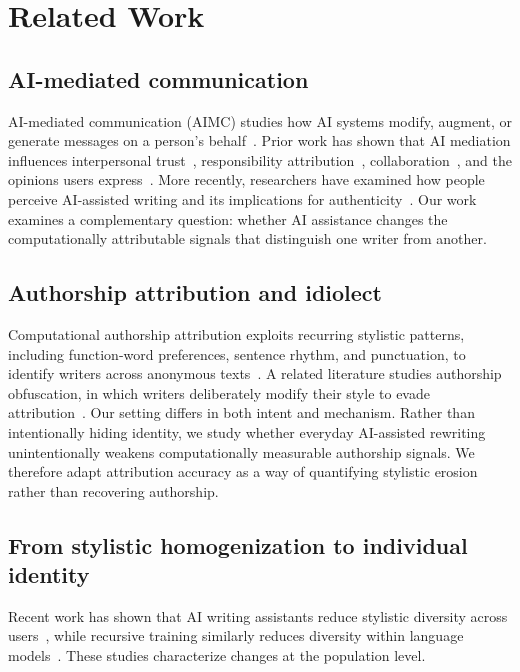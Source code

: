 \documentclass[sigconf,nonacm]{acmart}
\begin{document}
\section{Related Work}

\vspace{4pt}
\subsection{AI-mediated communication}

AI-mediated communication (AIMC) studies how AI systems modify, augment, or generate
messages on a person's behalf~\cite{hancock2020}. Prior work has shown that AI
mediation influences interpersonal trust~\cite{jakesch2019,hohenstein2023},
responsibility attribution~\cite{elish2019,hohenstein2020},
collaboration~\cite{hohenstein2023}, and the opinions users
express~\cite{jakeschcowrite}. More recently, researchers have examined how people
perceive AI-assisted writing and its implications for
authenticity~\cite{hwang2025,kadoma2025}. Our work examines a complementary question:
whether AI assistance changes the computationally attributable signals that
distinguish one writer from another.

\subsection{Authorship attribution and idiolect}

Computational authorship attribution exploits recurring stylistic patterns, including
function-word preferences, sentence rhythm, and punctuation, to identify writers
across anonymous texts~\cite{koppel2009,luar2021}. A related literature studies
authorship obfuscation, in which writers deliberately modify their style to evade
attribution~\cite{brennan2012,potthast2016}. Our setting differs in both intent and
mechanism. Rather than intentionally hiding identity, we study whether everyday
AI-assisted rewriting unintentionally weakens computationally measurable authorship
signals. We therefore adapt attribution accuracy as a way of quantifying stylistic
erosion rather than recovering authorship.

\subsection{From stylistic homogenization to individual identity}

Recent work has shown that AI writing assistants reduce stylistic diversity across
users~\cite{padmakumar2024,agarwal2025,doshi2024}, while recursive training similarly
reduces diversity within language models~\cite{shumailov2024}. These studies
characterize changes at the population level.
\end{document}
